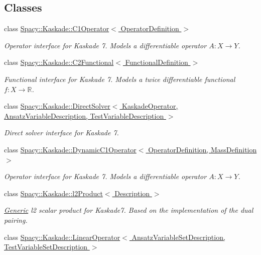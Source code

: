 \subsection*{Classes}
\begin{DoxyCompactItemize}
\item 
class \hyperlink{classSpacy_1_1Kaskade_1_1C1Operator}{Spacy\+::\+Kaskade\+::\+C1\+Operator$<$ Operator\+Definition $>$}
\begin{DoxyCompactList}\small\item\em Operator interface for Kaskade 7. Models a differentiable operator $A:X\rightarrow Y$. \end{DoxyCompactList}\item 
class \hyperlink{classSpacy_1_1Kaskade_1_1C2Functional}{Spacy\+::\+Kaskade\+::\+C2\+Functional$<$ Functional\+Definition $>$}
\begin{DoxyCompactList}\small\item\em Functional interface for Kaskade 7. Models a twice differentiable functional $f:X\rightarrow \mathbb{R}$. \end{DoxyCompactList}\item 
class \hyperlink{classSpacy_1_1Kaskade_1_1DirectSolver}{Spacy\+::\+Kaskade\+::\+Direct\+Solver$<$ Kaskade\+Operator, Ansatz\+Variable\+Description, Test\+Variable\+Description $>$}
\begin{DoxyCompactList}\small\item\em Direct solver interface for Kaskade 7. \end{DoxyCompactList}\item 
class \hyperlink{classSpacy_1_1Kaskade_1_1DynamicC1Operator}{Spacy\+::\+Kaskade\+::\+Dynamic\+C1\+Operator$<$ Operator\+Definition, Mass\+Definition $>$}
\begin{DoxyCompactList}\small\item\em Operator interface for Kaskade 7. Models a differentiable operator $A:X\rightarrow Y$. \end{DoxyCompactList}\item 
class \hyperlink{classSpacy_1_1Kaskade_1_1l2Product}{Spacy\+::\+Kaskade\+::l2\+Product$<$ Description $>$}
\begin{DoxyCompactList}\small\item\em \hyperlink{namespaceSpacy_1_1Generic}{Generic} l2 scalar product for Kaskade7. Based on the implementation of the dual pairing. \end{DoxyCompactList}\item 
class \hyperlink{classSpacy_1_1Kaskade_1_1LinearOperator}{Spacy\+::\+Kaskade\+::\+Linear\+Operator$<$ Ansatz\+Variable\+Set\+Description, Test\+Variable\+Set\+Description $>$}

\end{DoxyCompactItemize}
